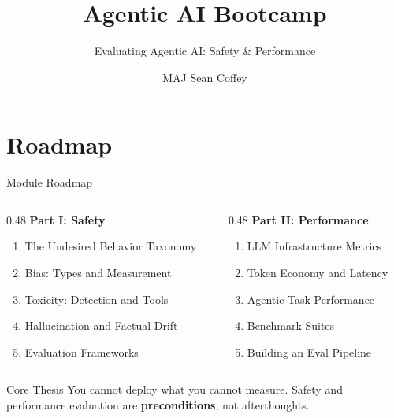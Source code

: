 \documentclass{beamer}       %
\title[]{Agentic AI Bootcamp}
\subtitle[]{Evaluating Agentic AI: Safety \& Performance}
\author[]{MAJ Sean Coffey}
\institute{Army Cyber Institute, U.S. Military Academy}
\date{\monthyeardate}
\begin{document}
\begin{frame}
    \titlepage
\end{frame}

\section*{Roadmap}
\begin{frame}{Module Roadmap}
    \small
    \begin{columns}[T]
        \begin{column}{0.48\textwidth}
            \textbf{\color{dangerred} Part I: Safety}
            \begin{enumerate}
                \item The Undesired Behavior Taxonomy
                \item Bias: Types and Measurement
                \item Toxicity: Detection and Tools
                \item Hallucination and Factual Drift
                \item Evaluation Frameworks
            \end{enumerate}
        \end{column}
        \begin{column}{0.48\textwidth}
            \textbf{\color{accentblue} Part II: Performance}
            \begin{enumerate}
                \item LLM Infrastructure Metrics
                \item Token Economy and Latency
                \item Agentic Task Performance
                \item Benchmark Suites
                \item Building an Eval Pipeline
            \end{enumerate}
        \end{column}
    \end{columns}
    \vfill
    \begin{alertblock}{Core Thesis}
        You cannot deploy what you cannot measure. Safety and performance evaluation are \textbf{preconditions}, not afterthoughts.
    \end{alertblock}
\end{frame}
\end{document}
